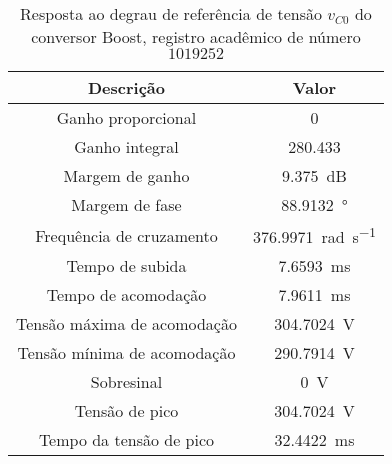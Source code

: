\begin{table}[!ht]
\centering
\caption{Resposta ao degrau de referência de tensão $v_{C0}$ do conversor Boost, registro acadêmico de número $1019252$}
\label{tab:resposta1malha}
\begin{tabular}{@{}cc@{}}
\toprule
\textbf{Descrição} & \textbf{Valor}\\ \midrule
Ganho proporcional & \SI{0}{}\\
Ganho integral & \SI{280.433}{}\\
Margem de ganho & \SI{9.375}{\deci\bel}\\
Margem de fase & \SI{88.9132}{\degree}\\
Frequência de cruzamento & \SI{376.9971}{\radian\per\s}\\
Tempo de subida & \SI{7.6593}{\milli\s}\\
Tempo de acomodação & \SI{7.9611}{\milli\s}\\
Tensão máxima de acomodação & \SI{304.7024}{\V}\\
Tensão mínima de acomodação & \SI{290.7914}{\V}\\
Sobresinal & \SI{0}{\V}\\
Tensão de pico & \SI{304.7024}{\V}\\
Tempo da tensão de pico & \SI{32.4422}{\milli\s}\\
\bottomrule
\end{tabular}
\end{table}

